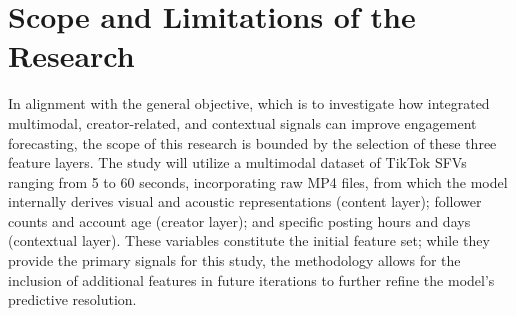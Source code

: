 
\section{Scope and Limitations of the Research}
\label{sec:scopelimitations}




In alignment with the general objective, which is to investigate how integrated multimodal, creator-related, and contextual signals can improve engagement forecasting, the scope of this research is bounded by the selection of these three feature layers. The study will utilize a multimodal dataset of TikTok SFVs ranging from 5 to 60 seconds, incorporating raw MP4 files, from which the model internally derives visual and acoustic representations (content layer); follower counts and account age (creator layer); and specific posting hours and days (contextual layer). These variables constitute the initial feature set; while they provide the primary signals for this study, the methodology allows for the inclusion of additional features in future iterations to further refine the model's predictive resolution.

